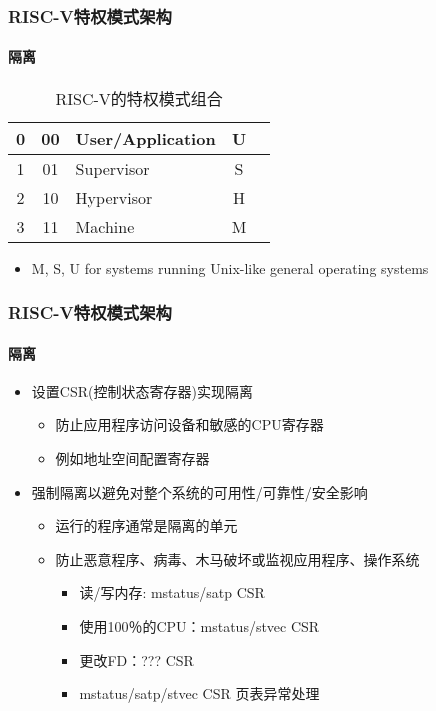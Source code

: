 
\begin{frame}
		\frametitle{RISC-V特权模式架构}
		\framesubtitle{隔离}
\begin{table}[h]
	\caption{RISC-V的特权模式组合}
 	\centering
 	\begin{tabular}{|c|c|l|c|l|}
 	\hline
	0 & 00 & User/Application & U \\\hline
	1 & 01 & Supervisor & S \\\hline
	2 & 10 & Hypervisor & H \\\hline
	3 & 11 & Machine & M \\\hline
   \end{tabular}
   \end{table}
\begin{itemize}
	
	\item M, S, U  for systems running Unix-like general operating systems
\end{itemize}


\end{frame}


\begin{frame}
	\frametitle{RISC-V特权模式架构}
	\framesubtitle{隔离}

	\begin{itemize}
		\item 设置CSR(控制状态寄存器)实现隔离
		\begin{itemize}
			\item 防止应用程序访问设备和敏感的CPU寄存器
			\item 例如地址空间配置寄存器
		\end{itemize} 
	\end{itemize}

	\begin{itemize}
		\item 强制隔离以避免对整个系统的可用性/可靠性/安全影响
		\begin{itemize}
		\item 运行的程序通常是隔离的单元
		\item 防止恶意程序、病毒、木马破坏或监视应用程序、操作系统	
			\begin{itemize}
			\item 读/写内存: mstatus/satp CSR
			\item 使用100％的CPU：mstatus/stvec CSR
			\item 更改FD：??? CSR
			\pause

			 	\item mstatus/satp/stvec CSR 页表异常处理

			\end{itemize}
		\end{itemize}
	\end{itemize}

\end{frame}

